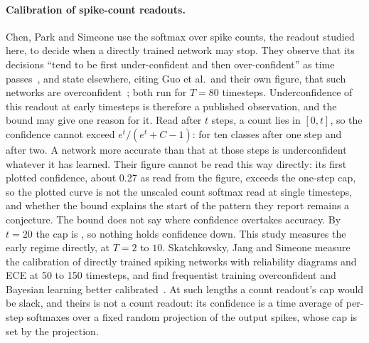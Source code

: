 \documentclass[10pt]{article}
\begin{document}
\paragraph{Calibration of spike-count readouts.}
Chen, Park and Simeone use the softmax over spike counts, the readout studied here, to decide
when a directly trained network may stop. They observe that its decisions ``tend to be first
under-confident and then over-confident'' as time passes~\citep{chen2025knowing}, %
and state elsewhere, citing Guo et al.\ and their own figure, that such networks are
overconfident~\citep{chen2024agreeing}; both run for %
$T=80$ timesteps. Underconfidence of this readout at early timesteps is therefore a published %
observation, and the bound may give one reason for it. Read after $t$ steps, a count lies in
$[0,t]$, so the confidence cannot exceed $e^{t}/(e^{t}+C-1)$: for ten classes \ceilTenOne{} after %
one step and \ceilTenTwo{} after two. A network more accurate than that at those steps is %
underconfident whatever it has learned. Their figure cannot be read this way directly: its first
plotted confidence, about 0.27 as read from the figure, exceeds the one-step cap, so the plotted %
curve is not the unscaled count softmax read at single timesteps, and whether the bound explains
the start of the pattern they report remains a conjecture. The bound does not say where
confidence overtakes accuracy. By $t=20$ the cap is \ceilTwentyTen{}, %
so nothing holds confidence down. This study measures the early regime directly, at $T=2$ to
$10$. Skatchkovsky, Jang and Simeone measure the calibration of directly trained spiking networks
with reliability diagrams and ECE at 50 to 150 timesteps, and find frequentist training
overconfident and Bayesian learning better calibrated~\citep{skatchkovsky2022bayesian}. At such %
lengths a count readout's cap would be slack, and theirs is not a count readout: its confidence
is a time average of per-step softmaxes over a fixed random projection of the output spikes, whose
cap is set by the projection.
\end{document}
